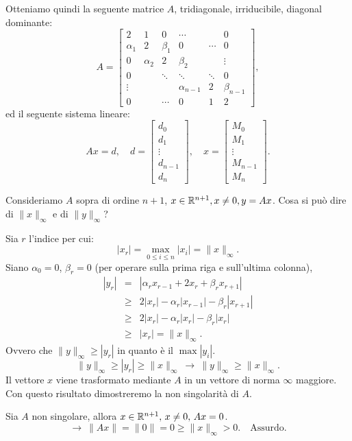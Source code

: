 Otteniamo quindi la seguente matrice $A$, tridiagonale, irriducibile,
diagonal dominante:
\[A =
\left[
\begin{array}{cccccc}
2 & 1 & 0 & \cdots & &0 \\
\alpha_1&  2 & \beta_1 & 0  &\cdots & 0 \\
0 &\alpha_2 & 2 & \beta_2 & & \vdots \\
0  & &\ddots &\ddots &\ddots &  0\\
\vdots & & &\alpha_{n-1} & 2& \beta_{n-1}\\
0 & & \cdots & 0 &1 & 2
\end{array}
\right],
\]
ed il seguente sistema lineare:
\[
Ax = d, \quad d = \left[\begin{array}{c}
d_0 \\
d_1 \\
\vdots \\
d_{n-1} \\
d_n
\end{array}
\right], \quad 
x = \left[\begin{array}{c}
M_0 \\
M_1 \\
\vdots \\
M_{n-1} \\
M_n
\end{array}
\right].
\]

Consideriamo $A$ sopra di ordine $n+1$, $x \in \mathbb{R}^{n+1}, x \neq 0, y =Ax$.
Cosa si può dire di $\|x\|_{\infty}$ e di $\|y\|_{\infty}$?

\begin{prop}
Sia $r$ l'indice per cui:
\[|x_r| = \max_{0 \leq i \leq n}|x_i| = \|x\|_{\infty}.
\]
Siano $\alpha_0 = 0$, $\beta_r = 0$ (per operare sulla prima riga e 
sull'ultima colonna),
\[
\begin{array}{lcl}
|y_r| & = & |\alpha_r x_{r-1} + 2x_r + \beta_rx_{r+1}| \\
   & \geq &  2|x_r|- \alpha_r|x_{r-1}| -\beta_{r}|x_{r+1}| \\
   & \geq & 2|x_r|- \alpha_r|x_{r}|-\beta_{r}|x_{r}| \\
   & \geq & |x_r|
= \|x\|_{\infty}.
\end{array}
\]
Ovvero che $\|y\|_{\infty} \geq |y_r|$ in quanto è il $\max |y_i|$. 
\[
\|y\|_{\infty} \geq |y_r| \geq \|x\|_\infty \ \longrightarrow \ \|y\|_{\infty} 
\geq \|x\|_\infty.
\]  
Il vettore $x$ viene trasformato mediante $A$ in un vettore di norma $\infty$
maggiore. Con questo risultato dimostreremo la non singolarità di $A$.
\end{prop}
\begin{dimo}
Sia $A$ non singolare, allora $x \in \mathbb{R}^{n+1}, \, x \neq 0, \, Ax = 0$.
\[
\longrightarrow \ \|Ax\| = \|0\| = 0 \geq \|x\|_\infty > 0. \quad 
\textrm{Assurdo.}
\]
\end{dimo}

